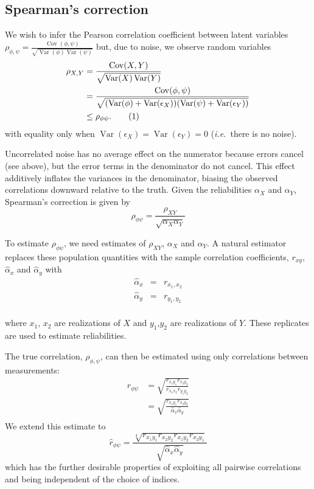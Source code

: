 \documentclass[10pt]{article}
\newcommand{\ie}{\textit{i.e.}}
\DeclareMathOperator{\Cov}{Cov}
\DeclareMathOperator{\Var}{Var}
\newcommand\numberthis{\addtocounter{equation}{1}\tag{\theequation}}
\begin{document}
\subsection*{Spearman's correction}

We wish to infer the Pearson correlation coefficient between latent
variables
$\rho_{\phi,\psi} = \frac{\Cov(\phi,\psi)}{\sqrt{\Var(\phi)\Var(\psi)}}$
but, due to noise, we observe random variables
\begin{align*}
  \rho_{X,Y} & = \frac{\Cov(X,Y)}{\sqrt{\Var(X)\Var(Y)}} \\
  & = \frac{\Cov(\phi,\psi)}{\sqrt{(\Var(\phi) +
      \Var(\epsilon_X))(\Var(\psi)+\Var(\epsilon_Y))}} \\
  & \le \rho_{\phi \psi}. \numberthis
\end{align*}
with equality only when $\Var(\epsilon_X)=\Var(\epsilon_Y)=0$ (\ie~there is
no noise).  

Uncorrelated noise has no average effect on the numerator because
errors cancel (see above), but the error terms in the denominator do
not cancel. This effect additively inflates the variances in the
denominator, biasing the observed correlations downward relative to
the truth.  Given the reliabilities $\alpha_X$ and $\alpha_Y$, Spearman's correction is
given by 
\begin{equation}
\rho_{\phi \psi} =\frac{\rho_{XY}}{\sqrt{\alpha_X \alpha_Y}}
\end{equation}

To estimate $\rho_{\phi \psi}$, we need estimates of $\rho_{XY}$,
$\alpha_X$ and $\alpha_Y$.  A natural estimator replaces
these population quantities with the sample correlation coefficients, $r_{xy}$,
$\hat{\alpha}_x$ and $\hat{\alpha}_y$ with 
\begin{eqnarray*}
\hat{\alpha}_x &=& r_{x_1,x_2}\\
\hat{\alpha}_y &=& r_{y_1,y_2}\\
\end{eqnarray*}

where $x_1$, $x_2$ are realizations of $X$ and $y_1$,$y_2$ are
realizations of $Y$.  These replicates are used to estimate reliabilities.

The true correlation, $\rho_{\phi,\psi}$, can then be
estimated using only correlations between measurements:
\begin{align*}
 \hat{r}_{\phi \psi} &= \sqrt{\frac{r_{x_1 y_1}r_{x_2 y_2}}{r_{x_1 x_2}r_{y_1 y_2}}} \\
  &= \sqrt{\frac{r_{x_1 y_1}r_{x_2 y_2}}{\hat{\alpha}_{x}\hat{\alpha}_{y}}} \\
\end{align*}
We extend this estimate to
\begin{equation*}
\hat{r}_{\phi \psi} = \frac{\sqrt[4]{r_{x_1 y_1}r_{x_2 y_2}r_{x_1
      y_2}r_{x_2 y_1}}}{\sqrt{\hat{\alpha}_{x}\hat{\alpha}_{y}}}
\end{equation*}
which has the further desirable properties of exploiting all pairwise
correlations and being independent of the choice of indices.
\end{document}
